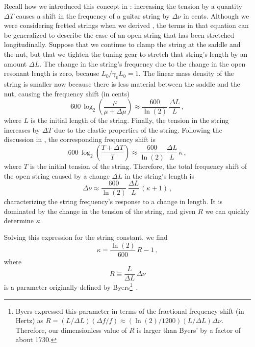 Recall how we introduced this concept in : increasing the tension by a quantity $\Delta T$ causes a shift in the frequency of a guitar string by $\Delta \nu$ in cents. Although we were considering fretted strings when we derived , the terms in that equation can be generalized to describe the case of an open string that has been stretched longitudinally. Suppose that we continue to clamp the string at the saddle and the nut, but that we tighten the tuning gear to stretch that string's length by an amount $\Delta L$. The change in the string's frequency due to the change in the open resonant length is zero, because $L_0 / \gamma_0 L_0 = 1$. The linear mass density of the string is smaller now because there is less material between the saddle and the nut, causing the frequency shift (in cents)
 \begin{equation}
600\, \log_2 \left(  \frac{\mu}{\mu + \Delta \mu} \right) \approx \frac{600}{\ln(2)}\, \frac{\Delta L}{L}\, ,
 \end{equation}
where $L$ is the initial length of the string. Finally, the tension in the string increases by $\Delta T$ due to the elastic properties of the string. Following the discussion in , the corresponding frequency shift  is
 \begin{equation}
600\, \log_2 \left(  \frac{T + \Delta T}{T} \right) \approx \frac{600}{\ln(2)}\, \frac{\Delta L}{L}\, \kappa\, ,
 \end{equation}
where $T$ is the initial tension of the string. Therefore, the total frequency shift of the open string caused by a change $\Delta L$ in the string's length is
 \begin{equation}
\Delta \nu \approx \frac{600}{\ln(2)}\, \frac{\Delta L}{L}\, (\kappa + 1)\, ,
 \end{equation}
characterizing the string frequency's response to a change in length. It is dominated by the change in the tension of the string, and given $R$ we can quickly determine $\kappa$.


Solving this expression for the string constant, we find
 \begin{equation}
\kappa = \frac{\ln(2)}{600}\, R - 1\, ,
 \end{equation}
where
 \begin{equation}
R \equiv \frac{L}{\Delta L}\, \Delta \nu
 \end{equation}
is a parameter originally defined by Byers\footnote{Byers expressed this parameter in terms of the fractional frequency shift (in Hertz) as $R = (L/\Delta L) (\Delta f/f) \approx (\ln(2)/1200) (L/\Delta L) \Delta \nu$. Therefore, our dimensionless value of $R$ is larger than Byers' by a factor of about 1730.}~\cite{ref:byers1996cgi,ref:varieschi2010icf}.

